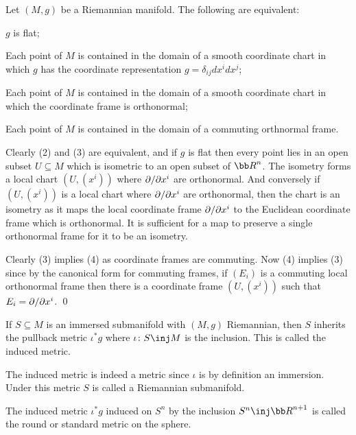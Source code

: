     Let $(M,g)$ be a Riemannian manifold.
    The following are equivalent:
    \benum
        \item $g$ is flat;
        \item Each point of $M$ is contained in the domain of a smooth coordinate chart in which $g$ has the coordinate representation $g=\delta_{ij}dx^idx^j$;
        \item Each point of $M$ is contained in the domain of a smooth coordinate chart in which the coordinate frame is orthonormal;
        \item Each point of $M$ is contained in the domain of a commuting orthnormal frame.
    \eenum

\eprop

\bproof

    Clearly (2) and (3) are equivalent, and if $g$ is flat then every point lies in an open subset $U\subseteq M$ which is
    isometric to an open subset of $\bR^n$.
    The isometry forms a local chart $(U,(x^i))$ where $\partial /\partial x^i$ are orthonormal.
    And conversely if $(U,(x^i))$ is a local chart where $\partial /\partial x^i$ are orthonormal, then the chart is an isometry as it
    maps the local coordinate frame $\partial /\partial x^i$ to the Euclidean coordinate frame which is orthonormal.
    It is sufficient for a map to preserve a single orthonormal frame for it to be an isometry.

    Clearly (3) implies (4) as coordinate frames are commuting.
    Now (4) implies (3) since by the canonical form for commuting frames, if $(E_i)$ is a commuting local orthonormal frame
    then there is a coordinate frame $(U,(x^i))$ such that $E_i=\partial /\partial x^i$.
    \qed

\eproof

\bdefn

    If $S\subseteq M$ is an immersed submanifold with $(M,g)$ Riemannian, then $S$ inherits the pullback metric $\iota^*g$ where $\iota\colon S\inj M$ is the inclusion.
    This is called the {\emphcolor induced metric}.

\edefn

The induced metric is indeed a metric since $\iota$ is by definition an immersion.
Under this metric $S$ is called a {\emphcolor Riemannian submanifold}.

\bexam

    The induced metric $\iota^*g$ induced on $S^n$ by the inclusion $S^n\inj\bR^{n+1}$ is called the {\emphcolor round} or {\emphcolor standard metric} on the sphere.

\eexam

